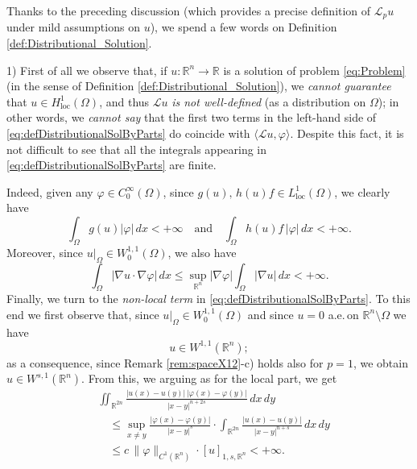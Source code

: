 \documentclass[11pt,a4paper]{amsart}
\def \LL {\mathcal{L}}
\theoremstyle{definition}
\theoremstyle{plain}
\numberwithin{equation}{section}
\begin{document}
{ Thanks to the preceding discussion (which provides a precise definition of 
  $\LL_{p}u$
 under mild assumptions on $u$),
 we spend a few words on Definition \ref{def:Distributional_Solution}.
	\medskip
	
	1)\,\,First of all we observe that, if $u:\mathbb{R}^n\to\mathbb{R}$ is a  solution of problem \eqref{eq:Problem} (in the sense of Definition
	 \ref{def:Distributional_Solution}), we \emph{cannot guarantee}
	 that $u\in H^1_{\mathrm{loc}}(\Omega)$, and thus $\LL u$
	 \emph{is not well-defined} (as a distribution on $\Omega$);
	 in other words, we \emph{cannot say} that the first two terms in the left-hand side of \eqref{eq:defDistributionalSolByParts} do coincide with 
	 $\langle \LL u,\varphi\rangle$.
	 Despite this fact, it is not difficult to see that all the integrals
	 appearing in \eqref{eq:defDistributionalSolByParts}
	 are finite. 
	 
	 Indeed, given any
	 $\varphi\in C_0^\infty(\Omega)$, since $g(u),\,h(u)f\in L^1_{\mathrm{loc}}(\Omega)$, we clearly have
	 $$\int_{\Omega}g(u)|\varphi|\,dx<+\infty\quad
	 \text{and}\quad\int_\Omega h(u)f\,|\varphi|\,dx < +\infty.$$
	 Moreover, since $u|_\Omega\in W_0^{1,1}(\Omega)$,  we also have
	 $$\int_\Omega |\nabla u\cdot\nabla \varphi|\,dx 
	 \leq \sup_{\mathbb{R}^n}|\nabla\varphi|\int_{\Omega}|\nabla u|\,dx < +\infty.
	 $$
 Finally, we turn to the \emph{non-local term}  in \eqref{eq:defDistributionalSolByParts}.  To this end
 we first observe that, since  $u|_\Omega\in W_0^{1,1}(\Omega)$
 and since
  $u=0$ a.e.\,on $\mathbb{R}^n\setminus\Omega$  we have
 $$u\in W^{1,1}(\mathbb{R}^n);$$ 
 as a consequence, since Remark \ref{rem:spaceX12}-c) holds also
 for $p = 1$, we obtain $u\in W^{s,1}(\mathbb{R}^n)$.
 From this, we arguing as for the local part, we get \begin{align*}
 	&\iint_{\mathbb{R}^{2n}}\frac{|u(x)-u(y)|\,|\varphi(x)-\varphi(y)|}{|x-y|^{n+2s}}\,dx\,dy \\
 	&\quad \leq \sup_{x\neq y}\frac{|\varphi(x)-\varphi(y)|}{|x-y|^s}\cdot\int_{\mathbb{R}^{2n}}
 	\frac{|u(x)-u(y)|}{|x-y|^{n+s}}\,dx\,dy \\
 	& \quad \leq c\,\|\varphi\|_{C^1(\mathbb{R}^n)}\cdot[u]_{1,s,\mathbb{R}^n}<+\infty.
 \end{align*}

}
\end{document}

